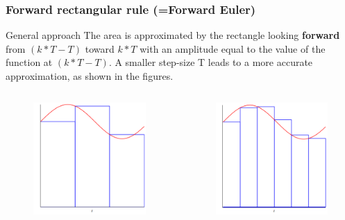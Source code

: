 \begin{frame}
	\frametitle{Forward rectangular rule (=Forward Euler)}

	\begin{block}{General approach}
		The area is approximated by the rectangle looking \textbf{forward} from $(k*T - T)$ toward $k*T$ with an amplitude equal to the value of the function at $(k*T - T)$. A smaller step-size T leads to a more accurate approximation, as shown in the figures.
	\end{block}

\begin{columns}
	\begin{column}{0.5\textwidth}
		\begin{figure}
			\centering
			\includegraphics[width=0.6\linewidth]{Forward1}
		\end{figure}
	\end{column}
	
	\begin{column}{0.5\textwidth}
		\begin{figure}
			\centering
			\includegraphics[width=0.6\linewidth]{Forward2}
		\end{figure}
	\end{column}
\end{columns}
\end{frame}

